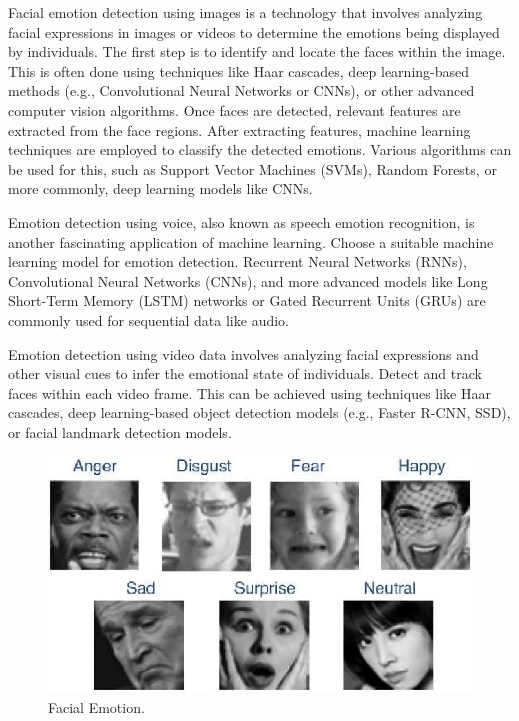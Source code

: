 \documentclass[conference]{IEEEtran}
\begin{document}
Facial emotion detection using images is a technology that involves analyzing facial expressions in images or videos to determine the emotions being displayed by individuals. The first step is to identify and locate the faces within the image. This is often done using techniques like Haar cascades, deep learning-based methods (e.g., Convolutional Neural Networks or CNNs), or other advanced computer vision algorithms.  Once faces are detected, relevant features are extracted from the face regions. After extracting features, machine learning techniques are employed to classify the detected emotions. Various algorithms can be used for this, such as Support Vector Machines (SVMs), Random Forests, or more commonly, deep learning models like CNNs.

Emotion detection using voice, also known as speech emotion recognition, is another fascinating application of machine learning. Choose a suitable machine learning model for emotion detection. Recurrent Neural Networks (RNNs), Convolutional Neural Networks (CNNs), and more advanced models like Long Short-Term Memory (LSTM) networks or Gated Recurrent Units (GRUs) are commonly used for sequential data like audio.

Emotion detection using video data involves analyzing facial expressions and other visual cues to infer the emotional state of individuals. Detect and track faces within each video frame. This can be achieved using techniques like Haar cascades, deep learning-based object detection models (e.g., Faster R-CNN, SSD), or facial landmark detection models.

\begin{figure}[htbp]
\centerline{\includegraphics[scale=0.35]{Facial_Emotion.png}}
\caption{Facial Emotion.}
\label{fig}
\end{figure}
\end{document}
